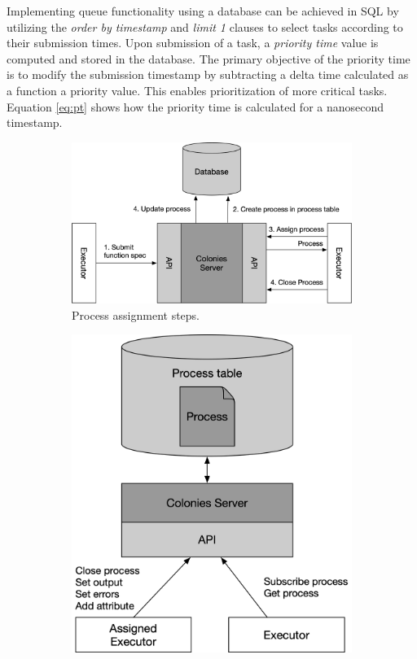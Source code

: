 \documentclass{article}
\begin{document}
Implementing queue functionality using a database can be achieved in SQL by utilizing the \emph{order by timestamp} and \emph{limit 1} clauses to select tasks according to their submission times. Upon submission of a task, a \emph{priority time} value is computed and stored in the database. The primary objective of the priority time is to modify the submission timestamp by subtracting a delta time calculated as a function a priority value. This enables prioritization of more critical tasks. Equation \ref{eq:pt} shows how the priority time is calculated for a nanosecond timestamp. 

\begin{figure}
     \centering
     \begin{subfigure}[b]{0.3\textwidth}
         \centering
         \includegraphics[scale=0.37]{arch.png}
         \caption{Process assignment steps.}
     \end{subfigure}
     \hfill
     \begin{subfigure}[b]{0.3\textwidth}
         \centering
         \includegraphics[scale=0.37]{process.png}

\end{subfigure}
\end{figure}
\end{document}
